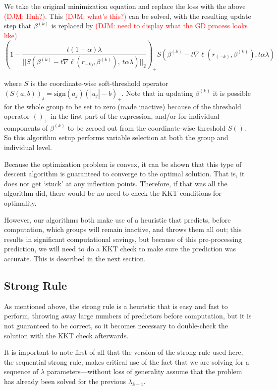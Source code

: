 \documentclass[titlepage]{article}
\newcommand{\djm}[1]{\textcolor{red}{(DJM: #1)}}
\begin{document}
We take the original minimization equation and replace the loss with the above \djm{Huh?}. This \djm{what's this?} can be solved, with the resulting update step that $\beta^{(k)}$ is replaced by \djm{need to display what the GD process looks like}
\[
\left(1-\frac{t(1-\alpha)\lambda}{||S(\beta^{(k)}-t\nabla \ell(r_{-k)},\beta^{(k)}),\ t\alpha\lambda)||_2}\right)_+ S(\beta^{(k)}-t\nabla \ell(r_{(-k)},\beta^{(k)}),t\alpha\lambda)
\]

where  $S$ is the coordinate-wise soft-threshold operator $(S(a,b))_j = \textrm{sign}(a_j)(|a_j|-b)_+$. Note that in updating $\beta^{(k)}$ it is possible for the whole group to be set to zero (made inactive) because of the threshold operator $()_+$ in the first part of the expression, and/or for individual components of $\beta^{(k)}$ to be zeroed out from the coordinate-wise threshold $S()$. So this algorithm setup performs variable selection at both the group and individual level.

Because the optimization problem is convex, it can be shown that this type of descent algorithm is guaranteed to converge to the optimal solution. That is, it does not get `stuck' at any inflection points. Therefore, if that was all the algorithm did, there would be no need to check the KKT conditions for optimality. 

However, our algorithms both make use of a heuristic that predicts, before computation, which groups will remain inactive, and throws them all out; this results in significant computational savings, but because of this pre-processing prediction, we will need to do a KKT check to make sure the prediction was accurate. This is described in the next section.

\subsection{Strong Rule}

As mentioned above, the strong rule is a heuristic that is easy and fast to perform, throwing away large numbers of predictors before computation, but it is not guaranteed to be correct, so it becomes necessary to double-check the solution with the KKT check afterwards. 

It is important to note first of all that the version of the strong rule used here, the sequential strong rule, makes critical use of the fact that we are solving for a sequence of $\lambda$ parameters---without loss of generality assume that the problem has already been solved for the previous $\lambda_{k-1}$.
\end{document}
